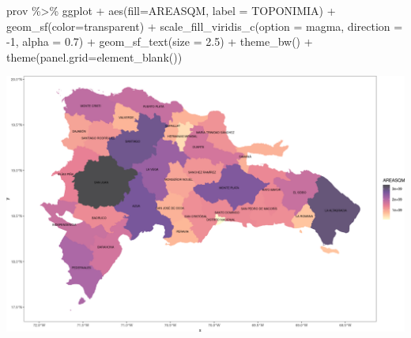 \documentclass[10pt,landscape,a3paper]{article}
\newenvironment{Shaded}{\begin{snugshade}}{\end{snugshade}}
\newcommand{\AttributeTok}[1]{\textcolor[rgb]{0.77,0.63,0.00}{#1}}
\newcommand{\DecValTok}[1]{\textcolor[rgb]{0.00,0.00,0.81}{#1}}
\newcommand{\FloatTok}[1]{\textcolor[rgb]{0.00,0.00,0.81}{#1}}
\newcommand{\FunctionTok}[1]{\textcolor[rgb]{0.00,0.00,0.00}{#1}}
\newcommand{\NormalTok}[1]{#1}
\newcommand{\SpecialCharTok}[1]{\textcolor[rgb]{0.00,0.00,0.00}{#1}}
\newcommand{\StringTok}[1]{\textcolor[rgb]{0.31,0.60,0.02}{#1}}
\begin{document}
\begin{Shaded}
\begin{Highlighting}[]
\NormalTok{prov }\SpecialCharTok{\%\textgreater{}\%}\NormalTok{ ggplot }\SpecialCharTok{+} \FunctionTok{aes}\NormalTok{(}\AttributeTok{fill=}\NormalTok{AREASQM, }\AttributeTok{label =}\NormalTok{ TOPONIMIA) }\SpecialCharTok{+}
  \FunctionTok{geom\_sf}\NormalTok{(}\AttributeTok{color=}\StringTok{\textquotesingle{}transparent\textquotesingle{}}\NormalTok{) }\SpecialCharTok{+}
  \FunctionTok{scale\_fill\_viridis\_c}\NormalTok{(}\AttributeTok{option =} \StringTok{\textquotesingle{}magma\textquotesingle{}}\NormalTok{, }\AttributeTok{direction =} \SpecialCharTok{{-}}\DecValTok{1}\NormalTok{, }\AttributeTok{alpha =} \FloatTok{0.7}\NormalTok{) }\SpecialCharTok{+}
  \FunctionTok{geom\_sf\_text}\NormalTok{(}\AttributeTok{size =} \FloatTok{2.5}\NormalTok{) }\SpecialCharTok{+}
  \FunctionTok{theme\_bw}\NormalTok{() }\SpecialCharTok{+}
  \FunctionTok{theme}\NormalTok{(}\AttributeTok{panel.grid=}\FunctionTok{element\_blank}\NormalTok{())}
\end{Highlighting}
\end{Shaded}

\begin{center}\includegraphics{img/administrative-1} \end{center}
\end{document}
